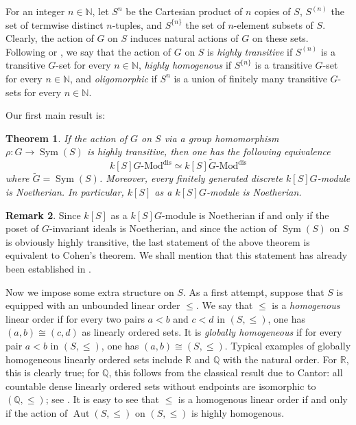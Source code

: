 \documentclass[11pt, reqno]{amsart}
\theoremstyle{plain}
\newtheorem{theorem}{Theorem}[section]
\numberwithin{equation}{section}
\theoremstyle{definition}
\newtheorem{remark}[theorem]{Remark}
\newcommand{\Mod}{{\textrm{-}\mathrm{Mod}}}
\DeclareMathOperator{\Aut}{Aut}
\DeclareMathOperator{\Sym}{Sym}
\newcommand{\dis}{{\mathrm{dis}}}
\begin{document}
For an integer $n \in \mathbb{N}$, let $S^n$ be the Cartesian product of $n$ copies of $S$, $S^{(n)}$ the set of termwise distinct $n$-tuples, and $S^{\{n\}}$ the set of $n$-element subsets of $S$. Clearly, the action of $G$ on $S$ induces natural actions of $G$ on these sets. Following \cite[Definition 3.11]{BMMN} or \cite[Section 2.1]{Ca}, we say that the action of $G$ on $S$ is \textit{highly transitive} if $S^{(n)}$ is a transitive $G$-set for every $n \in \mathbb{N}$, \textit{highly homogenous} if $S^{\{n\}}$ is a transitive $G$-set for every $n \in \mathbb{N}$, and \textit{oligomorphic} if $S^n$ is a union of finitely many transitive $G$-sets for every $n \in \mathbb{N}$.

Our first main result is:

\begin{theorem} \label{main result 1}
If the action of $G$ on $S$ via a group homomorphism $\rho: G \to \Sym(S)$ is highly transitive, then one has the following equivalence
\[
k[S]G \Mod^{\dis} \simeq k[S]\tilde{G} \Mod^{\dis}
\]
where $\tilde{G} = \Sym(S)$. Moreover, every finitely generated discrete $k[S]G$-module is Noetherian. In particular, $k[S]$ as a $k[S]G$-module is Noetherian.
\end{theorem}

\begin{remark}
Since $k[S]$ as a $k[S]G$-module is Noetherian if and only if the poset of $G$-invariant ideals is Noetherian, and since the action of $\Sym(S)$ on $S$ is obviously highly transitive, the last statement of the above theorem is equivalent to Cohen's theorem. We shall mention that this statement has already been established in \cite[Example 3.2(a)]{LS}.
\end{remark}

Now we impose some extra structure on $S$. As a first attempt, suppose that $S$ is equipped with an unbounded linear order $\leqslant$. We say that $\leqslant$ is a \textit{homogenous} linear order if for every two pairs $a < b$ and $c < d$ in $(S, \leqslant)$, one has $(a, b) \cong (c, d)$ as linearly ordered sets. It is \textit{globally homogeneous} if for every pair $a < b$ in $(S, \leqslant)$, one has $(a, b) \cong (S, \leqslant)$. Typical examples of globally homogeneous linearly ordered sets include $\mathbb{R}$ and $\mathbb{Q}$ with the natural order. For $\mathbb{R}$, this is clearly true; for $\mathbb{Q}$, this follows from the classical result due to Cantor: all countable dense linearly ordered sets without endpoints are isomorphic to $(\mathbb{Q}, \leqslant)$; see \cite[Theorem 9.3]{BMMN}. It is easy to see that $\leqslant$ is a homogenous linear order if and only if the action of $\Aut(S, \leqslant)$ on $(S, \leqslant)$ is highly homogenous.
\end{document}
